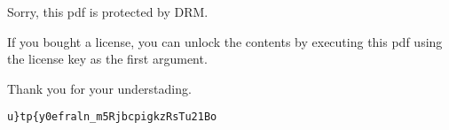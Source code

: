 \documentclass[a4paper,10pt]{article} %
\begin{document}
\vspace{3em}
\Large

Sorry, this pdf is protected by DRM.

If you bought a license, you can unlock the contents 
by executing this pdf using the license key as the first argument.

Thank you for your understading.

\verb|u}tp{y0efraln_m5RjbcpigkzRsTu21Bo|
\end{document}
